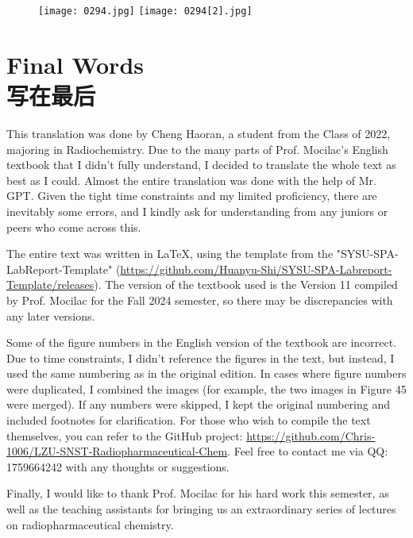 \documentclass[dvipsnames, svgnames,a4paper,11pt]{article}
\begin{document}
\begin{figure}[h]
    \centering
    \texttt{[image: 0294.jpg]} \hspace{0.2in}
    \texttt{[image: 0294[2].jpg]}  
     \label{fig387}
\end{figure}


\newpage

\section{Final Words \\ 写在最后}

This translation was done by Cheng Haoran, a student from the Class of 2022, majoring in Radiochemistry. Due to the many parts of Prof. Mocilac's English textbook that I didn't fully understand, I decided to translate the whole text as best as I could. Almost the entire translation was done with the help of Mr. GPT. Given the tight time constraints and my limited proficiency, there are inevitably some errors, and I kindly ask for understanding from any juniors or peers who come across this.

The entire text was written in \LaTeX, using the template from the "SYSU-SPA-LabReport-Template" (\url{https://github.com/Huanyu-Shi/SYSU-SPA-Labreport-Template/releases}). The version of the textbook used is the Version 11 compiled by Prof. Mocilac for the Fall 2024 semester, so there may be discrepancies with any later versions.

Some of the figure numbers in the English version of the textbook are incorrect. Due to time constraints, I didn’t reference the figures in the text, but instead, I used the same numbering as in the original edition. In cases where figure numbers were duplicated, I combined the images (for example, the two images in Figure 45 were merged). If any numbers were skipped, I kept the original numbering and included footnotes for clarification. For those who wish to compile the text themselves, you can refer to the GitHub project: \url{https://github.com/Chris-1006/LZU-SNST-Radiopharmaceutical-Chem}. Feel free to contact me via QQ: 1759664242 with any thoughts or suggestions.

Finally, I would like to thank Prof. Mocilac for his hard work this semester, as well as the teaching assistants for bringing us an extraordinary series of lectures on radiopharmaceutical chemistry.
\end{document}
